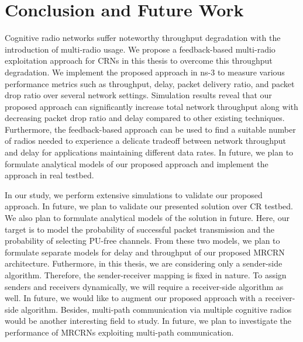 \chapter{Conclusion and Future Work}
Cognitive radio networks suffer noteworthy throughput degradation with the introduction of multi-radio usage. We propose a feedback-based multi-radio exploitation approach for CRNs in this thesis to overcome this throughput degradation. We implement the proposed approach in ns-3 to measure various performance metrics such as throughput, delay, packet delivery ratio, and packet drop ratio over several network settings. Simulation results reveal that our proposed approach can significantly increase total network throughput along with decreasing packet drop ratio and delay compared to other existing techniques. Furthermore, the feedback-based approach can be used to find a suitable number of radios needed to experience a delicate tradeoff between network throughput and delay for applications maintaining different data rates. In future, we plan to formulate analytical models of our proposed approach and implement the approach in real testbed.

In our study, we perform extensive simulations to validate our proposed approach. In future, we plan to validate our presented solution over CR testbed. We also plan to formulate analytical models of the solution in future. Here, our target is to model the probability of successful packet transmission and the probability of selecting PU-free channels. From these two models, we plan to formulate separate models for delay and throughput of our proposed MRCRN architecture. Futhermore, in this thesis, we are considering only a sender-side algorithm. Therefore, the sender-receiver mapping is fixed in nature. To assign senders and receivers dynamically, we will require a receiver-side algorithm as well. In future, we would like to augment our proposed approach with a receiver-side algorithm. Besides, multi-path communication via multiple cognitive radios would be another interesting field to study. In future, we plan to investigate the performance of MRCRNs exploiting multi-path communication.
\endinput

